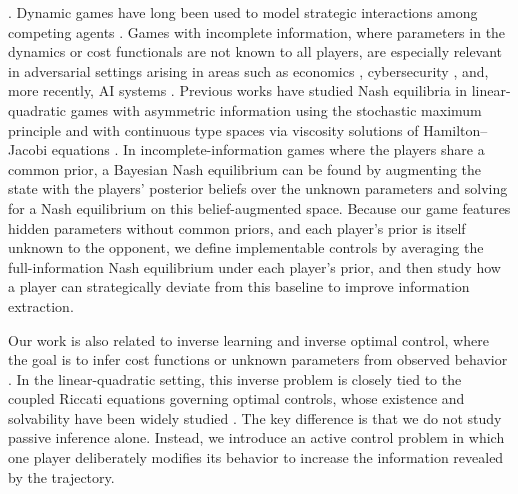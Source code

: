 \documentclass[letterpaper, 10 pt, conference]{ieeeconf}
\begin{document}
{}. Dynamic games have long been used to model strategic interactions among competing agents \cite{bacsar1998dynamic, carmona2016lectures, zhou2025adversarial,zhou2025integrating,kim2026stealthy,kim2024defining}. Games with incomplete information, where parameters in the dynamics or cost functionals are not known to all players, are especially relevant in adversarial settings arising in areas such as economics \cite{morris2002social}, cybersecurity \cite{zhang2020game}, and, more recently, AI systems \cite{hubinger2019risks}. Previous works have studied Nash equilibria in linear-quadratic games with asymmetric information using the stochastic maximum principle \cite{chang2014linear} and with continuous type spaces via viscosity solutions of Hamilton--Jacobi equations \cite{cardaliaguet2012games}. 
In incomplete-information games where the players share a common prior, a Bayesian Nash equilibrium \cite{harsanyi1967games} can be found by augmenting the state with the players' posterior beliefs over the unknown parameters and solving for a Nash equilibrium on this belief-augmented space.
Because our game features hidden parameters without common priors, and each player's prior is itself unknown to the opponent, we define implementable controls by averaging the full-information Nash equilibrium under each player's prior, and then study how a player can strategically deviate from this baseline to improve information extraction. 

Our work is also related to inverse learning and inverse optimal control, where the goal is to infer cost functions or unknown parameters from observed behavior \cite{molloy2017inverse,peters2021inferring,hu2025strategic,ward2025active}. In the linear-quadratic setting, this inverse problem is closely tied to the coupled Riccati equations governing optimal controls, whose existence and solvability have been widely studied \cite{abou2012matrix,papavassilopoulos1979existence}. The key difference is that we do not study passive inference alone. Instead, we introduce an active control problem in which one player deliberately modifies its behavior to increase the information revealed by the trajectory.
\end{document}
